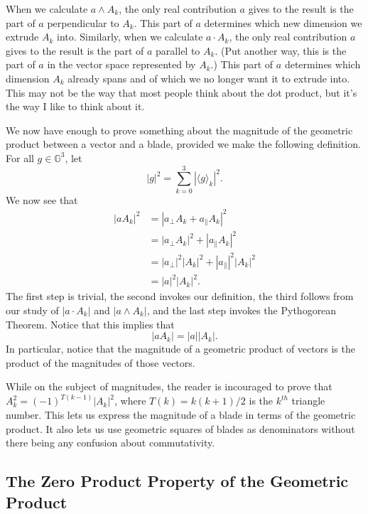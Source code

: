 \documentclass{article}
\newcommand{\G}{\mathbb{G}}
\newcommand{\prl}{\parallel}
\newcommand{\prp}{\perp}
\begin{document}
When we calculate $a\wedge A_k$, the only real contribution $a$ gives to
the result is the part of $a$ perpendicular to $A_k$.  This part of $a$
determines which new dimension we extrude $A_k$ into.  Similarly, when we calculate
$a\cdot A_k$, the only real contribution $a$ gives to the result is the part of $a$
parallel to $A_k$.  (Put another way, this is the part of $a$ in the vector space
represented by $A_k$.)  This part of $a$ determines which dimension $A_k$ already
spans and of which we no longer want it to extrude into.  This may not be the
way that most people think about the dot product, but it's the way I like to think
about it.

We now have enough to prove something about the magnitude of the geometric
product between a vector and a blade, provided we make the following definition.
For all $g\in\G^3$, let
\begin{equation*}
|g|^2 = \sum_{k=0}^3 |\langle g\rangle_k|^2.
\end{equation*}
We now see that
\begin{align*}
|aA_k|^2 &= |a_{\prp}A_k+a_{\prl}A_k|^2 \\
 &= |a_{\prp}A_k|^2 + |a_{\prl}A_k|^2 \\
 &= |a_{\prp}|^2|A_k|^2 + |a_{\prl}|^2|A_k|^2 \\
 &= |a|^2|A_k|^2.
\end{align*}
The first step is trivial, the second invokes our definition, the third follows
from our study of $|a\cdot A_k|$ and $|a\wedge A_k|$, and the last step invokes
the Pythogorean Theorem.  Notice that this implies that
\begin{equation}\label{mag_result}
|aA_k|=|a||A_k|.
\end{equation}
In particular, notice that the magnitude of a geometric product of vectors is
the product of the magnitudes of those vectors.

While on the subject of magnitudes,
the reader is incouraged to prove that $A_k^2=(-1)^{T(k-1)}|A_k|^2$,
where $T(k)=k(k+1)/2$ is the $k^{th}$ triangle number.
This lets us express the magnitude of a blade in terms of the geometric product.
It also lets us use geometric squares of blades as denominators
without there being any confusion about commutativity.

\subsection{The Zero Product Property of the Geometric Product}
\end{document}
